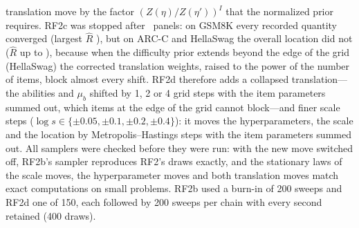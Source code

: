 {translation move by the factor $(Z(\eta)/Z(\eta'))^I$ that the normalized prior requires.
RF2c was stopped after \RfcPanels\ panels: on GSM8K every recorded quantity converged
(largest $\hat R$ \RfcGsmRhatMax), but on ARC-C and HellaSwag the overall location did not
($\hat R$ up to \RfcLocRhatMax), because when the difficulty prior extends beyond the edge of
the grid (HellaSwag) the corrected translation weights, raised to the power of the number of
items, block almost every shift. RF2d therefore adds a collapsed translation---the abilities
and $\mu_b$ shifted by 1, 2 or 4 grid steps with the item parameters summed out, which items
at the edge of the grid cannot block---and finer scale steps
($\log s\in\{\pm0.05,\pm0.1,\pm0.2,\pm0.4\}$): it moves the hyperparameters, the scale and
the location by Metropolis--Hastings steps with the item parameters summed out. All samplers
were checked before they were run: with the new move switched off, RF2b's sampler reproduces
RF2's draws exactly, and the stationary laws of the scale moves, the hyperparameter moves and
both translation moves match exact computations on small problems. RF2b used a burn-in of
200 sweeps and RF2d one of 150, each followed by 200 sweeps per chain with every second
retained (400 draws).}
\newcommand{\RobustMCMCExact}{%
RF2d came much closer to convergence (median acceptance: translation \ExtAccTrans\%, scale
\ExtAccMed\%, hyperparameter moves about \ExtAccMuA\%). $\hat R<1.05$ held on
\ExtLocRhatFive\% of panels for the location, \ExtScaleRhatFive\% for the ability scale, and
\ExtMuBRhatFive\%, \ExtSdBRhatFive\%, \ExtMuARhatFive\% and \ExtSdARhatFive\% for $\mu_b$,
$\sigma_b$, $\mu_a$ and $\sigma_a$, with medians of $\hat R$ between \ExtLocRhatMed\ and
\ExtRhatMedMaxAll\ across these quantities, a largest value of \ExtRhatMaxAll\ (against
\ConvHypRhatMax\ in RF2), and median bulk ESS between \ExtEssMedMin\ and \ExtLocEssMed\
(Table~\ref{tab:rf2x}, Figure~\ref{fig:rf2dtraces}). No chain stayed at the lower bound of
$\sigma_a$, but on \ExtBoxSdB\ panels $\sigma_b$ and on \ExtBoxSdA\ panels $\sigma_a$ spent
more than a quarter of the sweeps within 5\% of the upper bound of the prior box inherited
from the frozen sampler (4 and 1.5), which therefore constrains the posterior there. With
$\hat R<1.05$ on only \ExtRhatFiveMin\% of panels for the slowest quantity, short of the 90\%
fixed in advance, the convergence criterion was \ExtConverged, and a fully converged
comparator was not obtained. The four chains' held-out log losses differed by a median of
\ExtLLSpreadMed\% (at most \ExtLLSpreadMax\%). Under the model of Lemma~\ref{lem:exact}, the
posterior mean of the ability scale exceeded EOST-M's point estimate on \ExtPostAboveEb\% of
panels (median ratio \ExtPostOverEbMed): the calibration that EOST-M conditions on has a
smaller spread than the posterior.}
